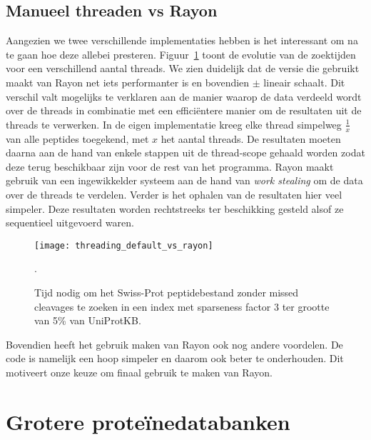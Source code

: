 \subsection{Manueel threaden vs Rayon}\label{subsec:manueel-threaden-vs-rayon}
Aangezien we twee verschillende implementaties hebben is het interessant om na te gaan hoe deze allebei presteren.
Figuur~\ref{fig:threading_default_vs_rayon} toont de evolutie van de zoektijden voor een verschillend aantal threads.
We zien duidelijk dat de versie die gebruikt maakt van Rayon net iets performanter is en bovendien $\pm$ lineair schaalt.
Dit verschil valt mogelijks te verklaren aan de manier waarop de data verdeeld wordt over de threads in combinatie met een efficiëntere manier om de resultaten uit de threads te verwerken.
In de eigen implementatie kreeg elke thread simpelweg $\frac{1}{x}$ van alle peptides toegekend, met $x$ het aantal threads.
De resultaten moeten daarna aan de hand van enkele stappen uit de thread-scope gehaald worden zodat deze terug beschikbaar zijn voor de rest van het programma.
Rayon maakt gebruik van een ingewikkelder systeem aan de hand van \textit{work stealing}\cite{rayon_stealing} om de data over de threads te verdelen.
Verder is het ophalen van de resultaten hier veel simpeler.
Deze resultaten worden rechtstreeks ter beschikking gesteld alsof ze sequentieel uitgevoerd waren.

\begin{figure}[H]
    \centering
    \texttt{[image: threading\_default\_vs\_rayon]}
    \caption{Tijd nodig om het Swiss-Prot peptidebestand zonder missed cleavages te zoeken in een index met sparseness factor 3 ter grootte van 5\% van UniProtKB.}.
    \label{fig:threading_default_vs_rayon}
\end{figure}

Bovendien heeft het gebruik maken van Rayon ook nog andere voordelen.
De code is namelijk een hoop simpeler en daarom ook beter te onderhouden.
Dit motiveert onze keuze om finaal gebruik te maken van Rayon.

\section{Grotere proteïnedatabanken}
